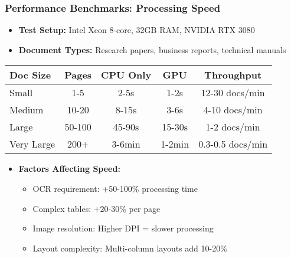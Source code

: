 \begin{frame}[fragile]\frametitle{Performance Benchmarks: Processing Speed}
      \begin{itemize}
        \item \textbf{Test Setup:} Intel Xeon 8-core, 32GB RAM, NVIDIA RTX 3080
        \item \textbf{Document Types:} Research papers, business reports, technical manuals
      \end{itemize}

\begin{table}[h]
\centering
\small
\begin{tabular}{|l|c|c|c|c|}
\hline
\textbf{Doc Size} & \textbf{Pages} & \textbf{CPU Only} & \textbf{GPU} & \textbf{Throughput} \\
\hline
Small & 1-5 & 2-5s & 1-2s & 12-30 docs/min \\
\hline
Medium & 10-20 & 8-15s & 3-6s & 4-10 docs/min \\
\hline
Large & 50-100 & 45-90s & 15-30s & 1-2 docs/min \\
\hline
Very Large & 200+ & 3-6min & 1-2min & 0.3-0.5 docs/min \\
\hline
\end{tabular}
\end{table}

      \begin{itemize}
        \item \textbf{Factors Affecting Speed:}
        \begin{itemize}
            \item OCR requirement: +50-100\% processing time
            \item Complex tables: +20-30\% per page
            \item Image resolution: Higher DPI = slower processing
            \item Layout complexity: Multi-column layouts add 10-20\%
        \end{itemize}
      \end{itemize}
\end{frame}

